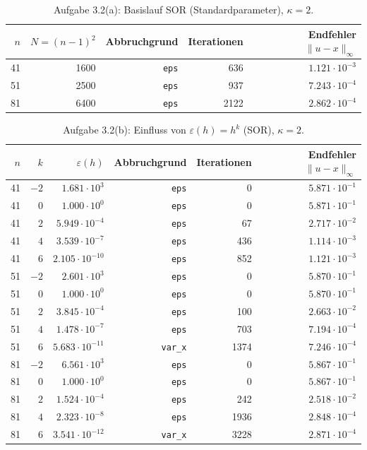 \documentclass[11pt,a4paper]{article}
\begin{document}
\begin{table}[H]
\centering
\caption{Aufgabe 3.2(a): Basislauf SOR (Standardparameter), $\kappa=2$.}
\label{tab:exp-a}
\begin{tabular}{rrrrr}
\hline
$n$ & $N=(n-1)^2$ & Abbruchgrund & Iterationen & Endfehler $\|u-x\|_\infty$ \\
\hline
41 & 1600 & \texttt{eps} & 636  & $1.121\cdot 10^{-3}$ \\
51 & 2500 & \texttt{eps} & 937  & $7.243\cdot 10^{-4}$ \\
81 & 6400 & \texttt{eps} & 2122 & $2.862\cdot 10^{-4}$ \\
\hline
\end{tabular}
\end{table}
\begin{table}[H]
\centering
\caption{Aufgabe 3.2(b): Einfluss von $\varepsilon(h)=h^k$ (SOR), $\kappa=2$.}
\label{tab:exp-b}
\begin{tabular}{rrrrrr}
\hline
$n$ & $k$ & $\varepsilon(h)$ & Abbruchgrund & Iterationen & Endfehler $\|u-x\|_\infty$ \\
\hline
41 & $-2$ & $1.681\cdot 10^{3}$  & \texttt{eps}   & 0   & $5.871\cdot 10^{-1}$ \\
41 & $0$  & $1.000\cdot 10^{0}$  & \texttt{eps}   & 0   & $5.871\cdot 10^{-1}$ \\
41 & $2$  & $5.949\cdot 10^{-4}$ & \texttt{eps}   & 67  & $2.717\cdot 10^{-2}$ \\
41 & $4$  & $3.539\cdot 10^{-7}$ & \texttt{eps}   & 436 & $1.114\cdot 10^{-3}$ \\
41 & $6$  & $2.105\cdot 10^{-10}$& \texttt{eps}   & 852 & $1.121\cdot 10^{-3}$ \\
\hline
51 & $-2$ & $2.601\cdot 10^{3}$  & \texttt{eps}   & 0   & $5.870\cdot 10^{-1}$ \\
51 & $0$  & $1.000\cdot 10^{0}$  & \texttt{eps}   & 0   & $5.870\cdot 10^{-1}$ \\
51 & $2$  & $3.845\cdot 10^{-4}$ & \texttt{eps}   & 100 & $2.663\cdot 10^{-2}$ \\
51 & $4$  & $1.478\cdot 10^{-7}$ & \texttt{eps}   & 703 & $7.194\cdot 10^{-4}$ \\
51 & $6$  & $5.683\cdot 10^{-11}$& \texttt{var\_x} & 1374& $7.246\cdot 10^{-4}$ \\
\hline
81 & $-2$ & $6.561\cdot 10^{3}$  & \texttt{eps}   & 0   & $5.867\cdot 10^{-1}$ \\
81 & $0$  & $1.000\cdot 10^{0}$  & \texttt{eps}   & 0   & $5.867\cdot 10^{-1}$ \\
81 & $2$  & $1.524\cdot 10^{-4}$ & \texttt{eps}   & 242 & $2.518\cdot 10^{-2}$ \\
81 & $4$  & $2.323\cdot 10^{-8}$ & \texttt{eps}   & 1936& $2.848\cdot 10^{-4}$ \\
81 & $6$  & $3.541\cdot 10^{-12}$& \texttt{var\_x} & 3228& $2.871\cdot 10^{-4}$ \\
\hline
\end{tabular}
\end{table}
\end{document}
